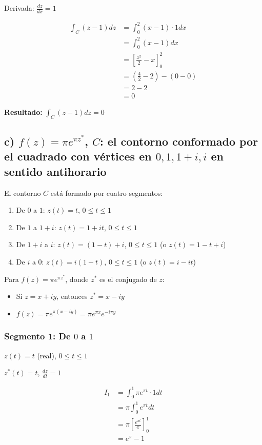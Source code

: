 \documentclass{article}
\begin{document}
Derivada: $\frac{dz}{dx} = 1$

\begin{align*}
\int_C (z - 1) dz &= \int_0^2 (x - 1) \cdot 1 dx \\
                  &= \int_0^2 (x - 1) dx \\
                  &= \left[\frac{x^2}{2} - x\right]_0^2 \\
                  &= \left(\frac{4}{2} - 2\right) - (0 - 0) \\
                  &= 2 - 2 \\
                  &= 0
\end{align*}

\textbf{Resultado:} $\int_C (z - 1) dz = 0$

\subsection*{c) $f(z) = \pi e^{\pi z^*}$, $C$: el contorno conformado por el cuadrado con vértices en $0, 1, 1 + i, i$ en sentido antihorario}

El contorno $C$ está formado por cuatro segmentos:
\begin{enumerate}
\item De $0$ a $1$: $z(t) = t$, $0 \leq t \leq 1$
\item De $1$ a $1 + i$: $z(t) = 1 + it$, $0 \leq t \leq 1$
\item De $1 + i$ a $i$: $z(t) = (1 - t) + i$, $0 \leq t \leq 1$ (o $z(t) = 1 - t + i$)
\item De $i$ a $0$: $z(t) = i(1 - t)$, $0 \leq t \leq 1$ (o $z(t) = i - it$)
\end{enumerate}

Para $f(z) = \pi e^{\pi z^*}$, donde $z^*$ es el conjugado de $z$:
\begin{itemize}
\item Si $z = x + iy$, entonces $z^* = x - iy$
\item $f(z) = \pi e^{\pi(x - iy)} = \pi e^{\pi x} e^{-i\pi y}$
\end{itemize}

\subsubsection*{Segmento 1: De $0$ a $1$}

$z(t) = t$ (real), $0 \leq t \leq 1$

$z^*(t) = t$, $\frac{dz}{dt} = 1$

\begin{align*}
I_1 &= \int_0^1 \pi e^{\pi t} \cdot 1 dt \\
    &= \pi \int_0^1 e^{\pi t} dt \\
    &= \pi \left[\frac{e^{\pi t}}{\pi}\right]_0^1 \\
    &= e^{\pi} - 1
\end{align*}
\end{document}
